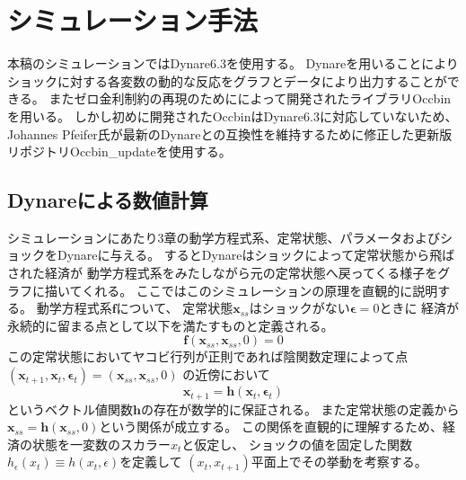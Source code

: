 
\section{シミュレーション手法}
\label{sec:model_preparation_method_main}

本稿のシミュレーションではDynare6.3を使用する。
Dynareを用いることによりショックに対する各変数の動的な反応をグラフとデータにより出力することができる。
またゼロ金利制約の再現のために\textcite{GuerrieriIacoviello2015}によって開発されたライブラリOccbinを用いる。
しかし初めに開発されたOccbinはDynare6.3に対応していないため、
Johannes Pfeifer氏が最新のDynareとの互換性を維持するために修正した更新版リポジトリOccbin\_updateを使用する。

\subsection{Dynareによる数値計算}
\label{sec:model_preparation_method_dynare}

シミュレーションにあたり3章の動学方程式系、定常状態、パラメータおよびショックをDynareに与える。
するとDynareはショックによって定常状態から飛ばされた経済が
動学方程式系をみたしながら元の定常状態へ戻ってくる様子をグラフに描いてくれる。
ここではこのシミュレーションの原理を直観的に説明する。
動学方程式系\(\mathbf{f}\)について、
定常状態\(\mathbf{x}_{ss}\)はショックがない\(\mathbf{\epsilon}=0\)ときに
経済が永続的に留まる点として以下を満たすものと定義される。
\begin{equation}
\mathbf{f}(\mathbf{x}_{ss},\mathbf{x}_{ss},0)=0
\label{form:model_preparation_method_dynare_steady_state_definition}
\end{equation}
この定常状態においてヤコビ行列が正則であれば陰関数定理によって点
\((\mathbf{x}_{t+1},\mathbf{x}_t,\mathbf{\epsilon}_t)=(\mathbf{x}_{ss},\mathbf{x}_{ss},0)\)
の近傍において
\begin{equation}
\mathbf{x}_{t+1}=\mathbf{h}(\mathbf{x}_t,\mathbf{\epsilon}_t)
\label{form:model_preparation_method_dynare_policy_function}
\end{equation}
というベクトル値関数\(\mathbf{h}\)の存在が数学的に保証される。
また定常状態の定義から\(\mathbf{x}_{ss}=\mathbf{h}(\mathbf{x}_{ss},0)\)という関係が成立する。
この関係を直観的に理解するため、経済の状態を一変数のスカラー\(x_t\)と仮定し、
ショックの値を固定した関数\(h_{\epsilon}(x_t)\equiv h(x_t,\epsilon)\)を定義して
\((x_t,x_{t+1})\)平面上でその挙動を考察する。

